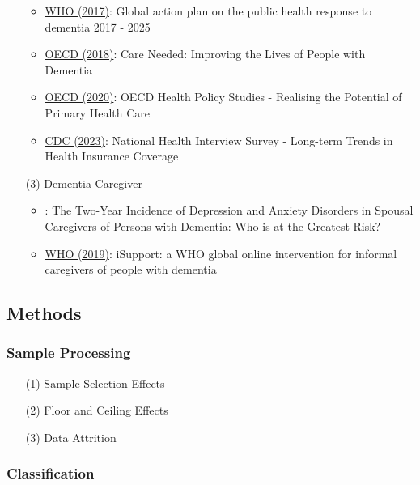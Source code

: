 \documentclass[12pt]{article}
\begin{document}
\begin{itemize}
\begin{itemize}
        \item \href{https://www.who.int/publications/i/item/global-action-plan-on-the-public-health-response-to-dementia-2017---2025}{WHO (2017)}: Global action plan on the public health response to dementia 2017 - 2025
        \item \href{https://www.oecd.org/health/care-needed-9789264085107-en.htm}{OECD (2018)}: Care Needed: Improving the Lives of People with Dementia
        \item \href{https://www.oecd.org/health/realising-the-potential-of-primary-health-care-a92adee4-en.htm}{OECD (2020)}: OECD Health Policy Studies - Realising the Potential of Primary Health Care
        \item \href{https://www.cdc.gov/nchs/data/nhis/health_insurance/trendhealthinsurance1968_2022.pdf}{CDC (2023)}: National Health Interview Survey - Long-term Trends in Health Insurance Coverage
    \end{itemize}
    \item[(3)] Dementia Caregiver
    \begin{itemize}
        \item \cite{joling2015two}: The Two-Year Incidence of Depression and Anxiety Disorders in Spousal Caregivers of Persons with Dementia: Who is at the Greatest Risk?
        \item \href{https://www.ncbi.nlm.nih.gov/pmc/articles/PMC6732694/}{WHO (2019)}: iSupport: a WHO global online intervention for informal caregivers of people with dementia
    \end{itemize}
\end{itemize}




\subsection{Methods}
\subsubsection{Sample Processing}
\begin{itemize}
    \item[(1)] Sample Selection Effects
    \item[(2)] Floor and Ceiling Effects
    \item[(3)] Data Attrition
\end{itemize}
\subsubsection{Classification}
\end{document}
